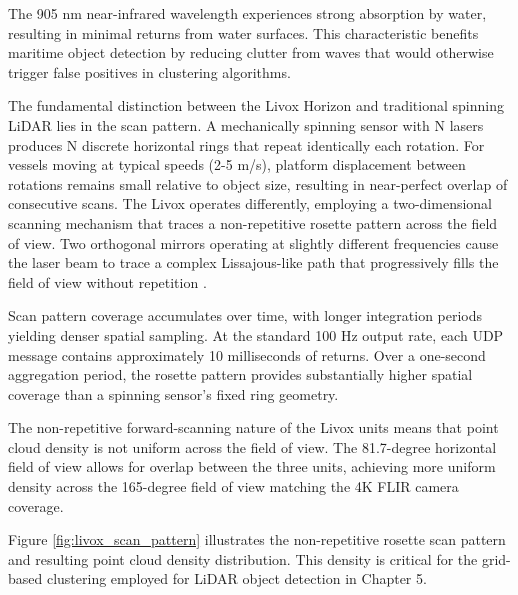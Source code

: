 \documentclass{erauthesis}
\begin{document}
The 905 nm near-infrared wavelength experiences strong absorption by water, resulting in minimal returns from water surfaces.
This characteristic benefits maritime object detection by reducing clutter from waves that would otherwise trigger false positives in clustering algorithms.

The fundamental distinction between the Livox Horizon and traditional spinning \ac{LiDAR} lies in the scan pattern.
A mechanically spinning sensor with N lasers produces N discrete horizontal rings that repeat identically each rotation.
For vessels moving at typical speeds (2-5 m/s), platform displacement between rotations remains small relative to object size, resulting in near-perfect overlap of consecutive scans.
The Livox operates differently, employing a two-dimensional scanning mechanism that traces a non-repetitive rosette pattern across the field of view.
Two orthogonal mirrors operating at slightly different frequencies cause the laser beam to trace a complex Lissajous-like path that progressively fills the field of view without repetition \cite{thompson2023}.

Scan pattern coverage accumulates over time, with longer integration periods yielding denser spatial sampling.
At the standard 100 Hz output rate, each UDP message contains approximately 10 milliseconds of returns.
Over a one-second aggregation period, the rosette pattern provides substantially higher spatial coverage than a spinning sensor's fixed ring geometry.

The non-repetitive forward-scanning nature of the Livox units means that point cloud density is not uniform across the field of view.
The 81.7-degree horizontal field of view allows for overlap between the three units, achieving more uniform density across the 165-degree field of view matching the 4K FLIR camera coverage.


Figure \ref{fig:livox_scan_pattern} illustrates the non-repetitive rosette scan pattern and resulting point cloud density distribution.
This density is critical for the grid-based clustering employed for \ac{LiDAR} object detection in Chapter 5.
\end{document}
